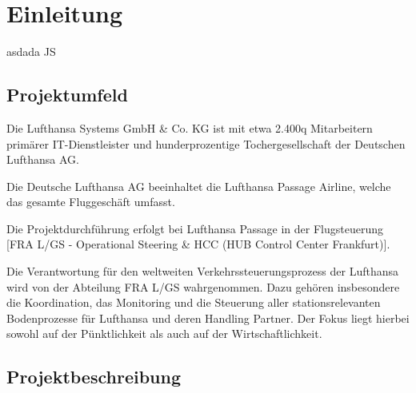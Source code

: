 
\section{Einleitung}
	asdada
	\gls{JS}

\subsection{Projektumfeld}
	Die Lufthansa Systems GmbH \& Co. KG ist mit etwa 2.400^^1 Mitarbeitern primärer IT-Dienstleister und hunderprozentige Tochergesellschaft der Deutschen Lufthansa AG. 
	
	Die Deutsche Lufthansa AG beeinhaltet die Lufthansa Passage Airline, welche das gesamte Fluggeschäft umfasst.

	Die Projektdurchführung erfolgt bei Lufthansa Passage in der Flugsteuerung [FRA L/GS - Operational Steering \& HCC (HUB Control Center Frankfurt)].

	Die Verantwortung für den weltweiten Verkehrssteuerungsprozess der Lufthansa wird von der
	Abteilung FRA L/GS wahrgenommen. Dazu gehören insbesondere die Koordination, das
	Monitoring und die Steuerung aller stationsrelevanten Bodenprozesse für Lufthansa und deren
	Handling Partner. Der Fokus liegt hierbei sowohl auf der Pünktlichkeit als auch auf der
	Wirtschaftlichkeit.

\subsection{Projektbeschreibung}
